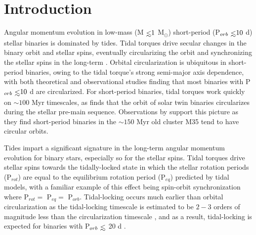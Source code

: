 \documentclass[twocolumn]{aastex61}
\def\lsim{~\rlap{$<$}{\lower 1.0ex\hbox{$\sim$}}}
\begin{document}



\section{Introduction} \label{sec:intro}

Angular momentum evolution in low-mass (M$\lsim 1$ M$_{\odot}$) short-period (P$_{orb} \lsim 10$ d) stellar binaries is dominated by tides.  Tidal torques drive secular changes in the binary orbit and stellar spins, eventually circularizing the orbit and synchronizing the stellar spins in the long-term \citep{Counselman1973}. Orbital circularization is ubiquitous in short-period binaries, owing to the tidal torque's strong semi-major axis dependence, with both theoretical \citep[e.g.][]{Zahn1989} and observational \citep[e.g.][]{Meibom2005,Mazeh2008,Lurie2017} studies finding that most binaries with P$_{orb} \lsim 10$ d are circularized. For short-period binaries, tidal torques work quickly on ${\sim}100$ Myr timescales, as \citet{Zahn1989} finds that the orbit of solar twin binaries circularizes during the stellar pre-main sequence.  Observations by \citet{Meibom2005} support this picture as they find short-period binaries in the ${\sim}150$ Myr old cluster M35 tend to have circular orbits.

Tides impart a significant signature in the long-term angular momentum evolution for binary stars, especially so for the stellar spins. Tidal torques drive stellar spins towards the tidally-locked state in which the stellar rotation periods (P$_{rot}$) are equal to the equilibrium rotation period (P$_{eq}$) predicted by tidal models, with a familiar example of this effect being spin-orbit synchronization where P$_{rot} = $ P$_{eq} = $ P$_{orb}$.  Tidal-locking occurs much earlier than orbital circularization as the tidal-locking timescale is estimated to be $2-3$ orders of magnitude less than the circularization timescale \citep{Zahn1989,Witte2002,Mazeh2008}, and as a result, tidal-locking is expected for binaries with P$_{orb} \lsim$ 20 d \citep[e.g.][]{Meibom2006,Mazeh2008,Zahn2008,Meibom2015}. 
\end{document}
